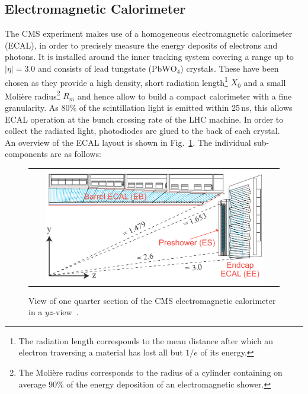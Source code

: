 \subsection{Electromagnetic Calorimeter}
\label{subsec:cms_ecal}
The CMS experiment makes use of a homogeneous electromagnetic calorimeter (ECAL), in order to precisely measure the energy deposits of electrons and photons. It is installed around the inner tracking system covering a range up to $|\eta| = 3.0$ and consists of lead tungstate (PbW$\mathrm{O}_4$) crystals. These have been chosen as they provide a high density, short radiation length\footnote{The radiation length corresponds to the mean distance after which an electron traversing a material has lost all but $1/e$ of its energy.} $X_0$ and a small Moli\`{e}re radius\footnote{The Moli\`{e}re radius corresponds to the radius of a cylinder containing on average 90\% of the energy deposition of an electromagnetic shower.} $R_m$ and hence allow to build a compact calorimeter with a fine granularity. As 80\% of the scintillation light is emitted within 25\,ns, this allows ECAL operation at the bunch crossing rate of the LHC machine. In order to collect the radiated light, photodiodes are glued to the back of each crystal.\\
An overview of the ECAL layout is shown in Fig.~\ref{fig:CMS_ecal}. The individual sub-components are as follows:
\begin{figure}[!tp]
  \centering
  \begin{tabular}{c}
    \includegraphics[width=0.9\textwidth]{figures/Figures_Experimental_Apparatus_ECALRapidity.png}
  \end{tabular}
  \caption{View of one quarter section of the CMS electromagnetic calorimeter in a $yz$-view~\cite{bib:cmsptdr1}.}
  \label{fig:CMS_ecal}
\end{figure}
